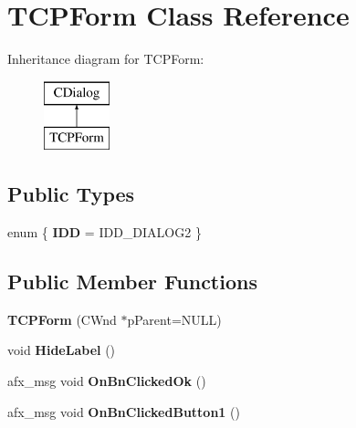 \hypertarget{class_t_c_p_form}{}\section{T\+C\+P\+Form Class Reference}
\label{class_t_c_p_form}
Inheritance diagram for T\+C\+P\+Form\+:\begin{figure}[H]
\begin{center}
\leavevmode
\includegraphics[height=2.000000cm]{class_t_c_p_form}
\end{center}
\end{figure}
\subsection*{Public Types}
\begin{DoxyCompactItemize}
\item 
\hypertarget{class_t_c_p_form_afb567f7a48a09bbff66797881a034c53}{}enum \{ {\bfseries I\+D\+D} = I\+D\+D\+\_\+\+D\+I\+A\+L\+O\+G2
 \}\label{class_t_c_p_form_afb567f7a48a09bbff66797881a034c53}

\end{DoxyCompactItemize}
\subsection*{Public Member Functions}
\begin{DoxyCompactItemize}
\item 
\hypertarget{class_t_c_p_form_a83410ff301d7a5068f040526e273128b}{}{\bfseries T\+C\+P\+Form} (C\+Wnd $\ast$p\+Parent=N\+U\+L\+L)\label{class_t_c_p_form_a83410ff301d7a5068f040526e273128b}

\item 
\hypertarget{class_t_c_p_form_aabec98179786dec8b2d157ffce755154}{}void {\bfseries Hide\+Label} ()\label{class_t_c_p_form_aabec98179786dec8b2d157ffce755154}

\item 
\hypertarget{class_t_c_p_form_ae5da34b74e9523384d961c4afe804616}{}afx\+\_\+msg void {\bfseries On\+Bn\+Clicked\+Ok} ()\label{class_t_c_p_form_ae5da34b74e9523384d961c4afe804616}

\item 
\hypertarget{class_t_c_p_form_af7bed7f1074e18ccc8b8f833028080a3}{}afx\+\_\+msg void {\bfseries On\+Bn\+Clicked\+Button1} ()\label{class_t_c_p_form_af7bed7f1074e18ccc8b8f833028080a3}

\end{DoxyCompactItemize}
